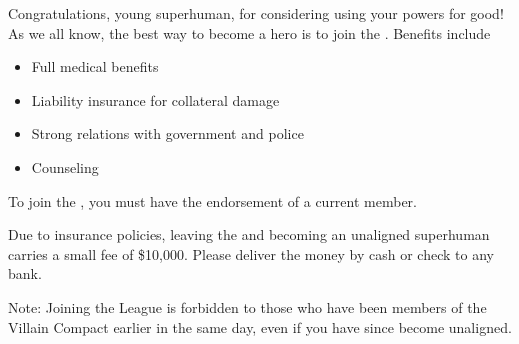 \documentclass[white]{guildcamp1}
\begin{document}
\name{\wHeroRecruitment{}}

Congratulations, young superhuman, for considering using your powers for good!  As we all know, the best way to become a hero is to join the \cHeroLeague{\intro}.  Benefits include

\begin{itemize}
\item Full medical benefits
\item Liability insurance for collateral damage
\item Strong relations with government and police
\item Counseling
\end{itemize}

To join the \cHeroLeague{}, you must have the endorsement of a current \cHeroLeague{} member.

Due to insurance policies, leaving the \cHeroLeague{} and becoming an unaligned superhuman carries a small fee of \$10,000.  Please deliver the money by cash or check to any bank.

Note: Joining the League is forbidden to those who have been members of the Villain Compact earlier in the same day, even if you have since become unaligned.
\end{document}
